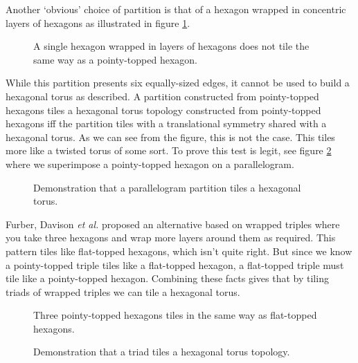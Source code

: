 	Another `obvious' choice of partition is that of a hexagon wrapped in
	concentric layers of hexagons as illustrated in figure
	\ref{fig:wrapped-hexagon-tiling}.
	
	\begin{figure}
		\center
		
		\caption[A wrapped-hexagon does not tile like a pointy-topped hexagon.]%
		{A single hexagon wrapped in layers of hexagons does not tile the
		same way as a pointy-topped hexagon.}
		\label{fig:wrapped-hexagon-tiling}
	\end{figure}
	
	While this partition presents six equally-sized edges, it cannot be used
	to build a hexagonal torus as described. A partition constructed from
	pointy-topped hexagons tiles a hexagonal torus topology constructed from
	pointy-topped hexagons iff the partition tiles with a translational
	symmetry shared with a hexagonal torus. As we can see from the figure,
	this is not the case. This tiles more like a twisted torus of some sort.
	To prove this test is legit, see figure \ref{fig:parallelogram-tiling}
	where we superimpose a pointy-topped hexagon on a parallelogram.
	
	\begin{figure}
		\center
		
		\caption[Parallelogram partition tiling a hexagonal torus.]%
		{Demonstration that a parallelogram partition tiles a hexagonal
		torus.}
		\label{fig:parallelogram-tiling}
	\end{figure}
	
	Furber, Davison \emph{et al.} \cite{davidsonWiring} proposed an
	alternative based on wrapped triples where you take three hexagons and
	wrap more layers around them as required. This pattern tiles like
	flat-topped hexagons, which isn't quite right. But since we know a
	pointy-topped triple tiles like a flat-topped hexagon, a flat-topped
	triple must tile like a pointy-topped hexagon. Combining these facts
	gives that by tiling triads of wrapped triples we can tile a hexagonal
	torus.
	
	\begin{figure}
		\center
		
		\caption[Three pointy-topped hexagons tile like a flat-topped hexagon.]%
		{Three pointy-topped hexagons tiles in the same way as flat-topped
		hexagons.}
		\label{fig:wrapped-triple-tiling}
	\end{figure}
	
	\begin{figure}
		\center
		
		\caption[Triads tile a hexagonal torus topology.]%
		{Demonstration that a triad tiles a hexagonal torus topology.}
		\label{fig:triad-tiling}
	\end{figure}
